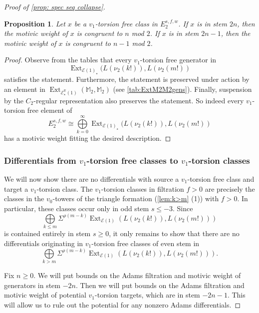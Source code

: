 \documentclass[10pt,a4paper]{amsart}
\newtheorem{proposition}{Proposition}
\DeclareMathOperator{\Ext}{Ext}
\newcommand{\cE}{{\mathcal E}}
\newcommand{\mM}{{\mathbb M}}
\newcommand{\mR}{{\mathbb R}}
\begin{document}
\begin{proof}[Proof of \cref{prop: spec seq collapse}]
\begin{proposition}
    Let $x$ be a $v_{1}$-torsion free class in $E_{2}^{s,f,w}$. If $x$ is in stem $2n$, then the motivic weight of $x$ is congruent to $n$ mod $2$. If $x$ is in stem $2n-1$, then the motivic weight of $x$ is congruent to $n-1$ mod $2$. 
\end{proposition}
\begin{proof}
    Observe from the tables that every $v_{1}$-torsion free generator in
    \[
    \Ext_{\cE(1)_{\star}}(L(\nu_{2}(k!)), L(\nu_{2}(m!))
    \]
    satisfies the statement. Furthermore, the statement is preserved under action by an element in $\Ext_{\cE^{\mR}_\star(1)}(\mM_{2}, \mM_{2})$ (see \cref{tab:ExtM2M2gens}). Finally, suspension by the $C_2$-regular representation also preserves the statement. So indeed every $v_{1}$-torsion free element of 
    \[
    E_{2}^{s,f,w} \cong \bigoplus\limits_{k=0}^{\infty}\Ext_{\cE(1)_{\star}}(L(\nu_{2}(k!)), L(\nu_{2}(m!))
    \]
    has a motivic weight fitting the desired description.
\end{proof}

\subsubsection{Differentials from $v_{1}$-torsion free classes to $v_{1}$-torsion classes}
We will now show there are no differentials with source a $v_1$-torsion free class and target a $v_{1}$-torsion class. The $v_1$-torsion classes in filtration $f > 0$ are precisely the classes in the $v_0$-towers of the triangle formation (\cref{lem:k>m} (1)) with $f >0$. In particular, these classes occur only in odd stem $s \leq -3$. Since 
\[
\bigoplus\limits_{k \le m}\Sigma^{\rho(m-k)}\Ext_{\cE(1)}( L(\nu_{2}(k!) ), L(\nu_{2}(m!) ) )
\]
is contained entirely in stem $s \ge 0$, it only remains to show that there are no differentials originating in $v_1$-torsion free classes of even stem in 
\[
\bigoplus\limits_{k > m}\Sigma^{\rho(m-k)}\Ext_{\cE(1)}( L(\nu_{2}(k!) ), L(\nu_{2}(m!) ) )
.\]


Fix $n \ge 0$. We will put bounds on the Adams filtration and motivic weight of generators in stem $-2n$. Then we will put bounds on the Adams filtration and motivic weight of potential $v_1$-torsion targets, which are in stem $-2n-1$. This will allow us to rule out the potential for any nonzero Adams differentials. 


\end{proof}
\end{document}
